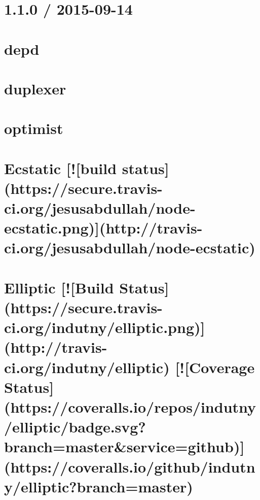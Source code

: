 \documentclass[twoside]{book}
\newcommand{\+}{\discretionary{\mbox{\scriptsize$\hookleftarrow$}}{}{}}
\begin{document}
\chapter{1.1.0 / 2015-\/09-\/14}
\label{md_app_web_node_modules_depd__history}

\chapter{depd}
\label{md_app_web_node_modules_depd__readme}

\chapter{duplexer}
\label{md_app_web_node_modules_duplexer__r_e_a_d_m_e}

\chapter{optimist}
\label{md_app_web_node_modules_ecstatic_node_modules_optimist_readme}

\chapter{Ecstatic \mbox{[}!\mbox{[}build status\mbox{]}(https\+://secure.travis-\/ci.org/jesusabdullah/node-\/ecstatic.png)\mbox{]}(http\+://travis-\/ci.org/jesusabdullah/node-\/ecstatic)}
\label{md_app_web_node_modules_ecstatic__r_e_a_d_m_e}

\chapter{Elliptic \mbox{[}!\mbox{[}Build Status\mbox{]}(https\+://secure.travis-\/ci.org/indutny/elliptic.png)\mbox{]}(http\+://travis-\/ci.org/indutny/elliptic) \mbox{[}!\mbox{[}Coverage Status\mbox{]}(https\+://coveralls.io/repos/indutny/elliptic/badge.svg?branch=master\&service=github)\mbox{]}(https\+://coveralls.io/github/indutny/elliptic?branch=master)}
\label{md_app_web_node_modules_elliptic__r_e_a_d_m_e}

\end{document}
